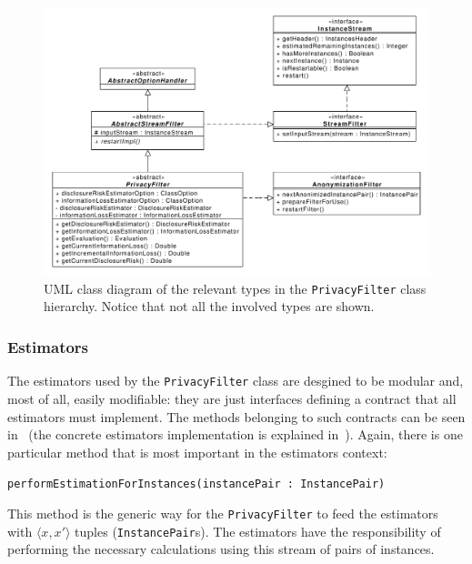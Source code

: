 \begin{figure}[h]
	\centering
	\includegraphics[width=1.0\textwidth]{figures/class_PrivacyFilter.pdf}
	\caption[\texttt{PrivacyFilter} type hierarchy diagram.]{UML class diagram of the relevant types in the \texttt{PrivacyFilter} class hierarchy. Notice that not all the involved types are shown.}
	\label{fig:privacy-filter-uml}
\end{figure}

\subsubsection*{Estimators}
\label{Implementation:PrivacyFilter:PrivacyFilter:Estimators}

The estimators used by the \texttt{PrivacyFilter} class are desgined to be modular and, most of all, easily modifiable: they are just interfaces defining a contract that all estimators must implement. The methods belonging to such contracts can be seen in~ (the concrete estimators implementation is explained in~). Again, there is one particular method that is most important in the estimators context:

\begin{center}
\texttt{performEstimationForInstances(instancePair : InstancePair)}
\end{center}

This method is the generic way for the \texttt{PrivacyFilter} to feed the estimators with $\langle x, x' \rangle$ tuples (\texttt{InstancePair}s). The estimators have the responsibility of performing the necessary calculations using this stream of pairs of instances.

